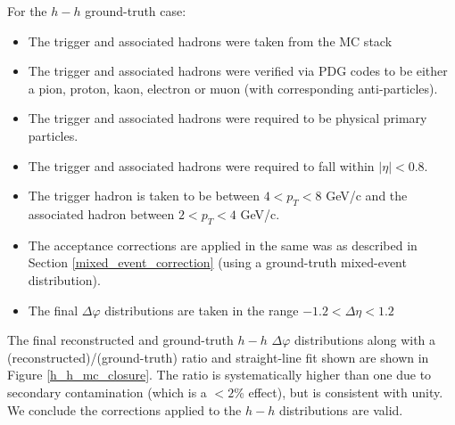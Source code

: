 \documentclass[ALICE,manyauthors]{ALICE_analysis_notes}
\begin{document}
For the $h-h$ ground-truth case: 
\begin{itemize}
\item The trigger and associated hadrons were taken from the MC stack 
\item The trigger and associated hadrons were verified via PDG codes to be either a pion, proton, kaon, electron or muon (with corresponding anti-particles).
\item The trigger and associated hadrons were required to be physical primary particles.
\item The trigger and associated hadrons were required to fall within $|\eta| < 0.8$.
\item The trigger hadron is taken to be between $4 < p_{T} < 8$ GeV/c and the associated hadron between $2 < p_{T} < 4$ GeV/c. 
\item The acceptance corrections are applied in the same was as described in Section \ref{mixed_event_correction} (using a ground-truth mixed-event distribution). 
\item The final $\Delta\varphi$ distributions are taken in the range $-1.2 < \Delta\eta < 1.2$
\end{itemize}

The final reconstructed and ground-truth $h-h$ $\Delta\varphi$ distributions along with a (reconstructed)/(ground-truth) ratio and straight-line fit shown are shown in Figure \ref{h_h_mc_closure}. The ratio is systematically higher than one due to secondary contamination (which is a $< 2$\% effect), but is consistent with unity. We conclude the corrections applied to the $h-h$ distributions are valid.
\end{document}
